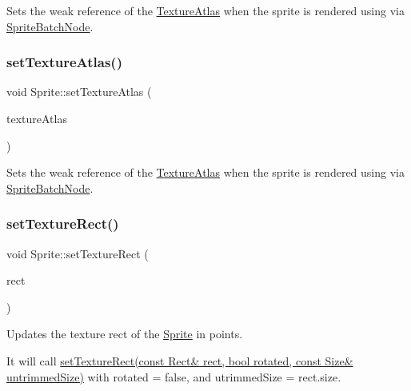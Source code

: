 Sets the weak reference of the \hyperlink{classTextureAtlas}{Texture\+Atlas} when the sprite is rendered using via \hyperlink{classSpriteBatchNode}{Sprite\+Batch\+Node}. \mbox{\label{classSprite_a66f74cd6fa807964c5a9d06d6c927e38}} 
\subsubsection{\texorpdfstring{set\+Texture\+Atlas()}{setTextureAtlas()}\hspace{0.1cm}{\footnotesize\ttfamily [2/2]}}
{\footnotesize\ttfamily void Sprite\+::set\+Texture\+Atlas (\begin{DoxyParamCaption}\item[{\hyperlink{classTextureAtlas}{Texture\+Atlas} $\ast$}]{texture\+Atlas }\end{DoxyParamCaption})\hspace{0.3cm}{\ttfamily [inline]}}

Sets the weak reference of the \hyperlink{classTextureAtlas}{Texture\+Atlas} when the sprite is rendered using via \hyperlink{classSpriteBatchNode}{Sprite\+Batch\+Node}. \mbox{\label{classSprite_a3d342558db357e2bec2eb3368b41bd1f}} 
\subsubsection{\texorpdfstring{set\+Texture\+Rect()}{setTextureRect()}\hspace{0.1cm}{\footnotesize\ttfamily [1/4]}}
{\footnotesize\ttfamily void Sprite\+::set\+Texture\+Rect (\begin{DoxyParamCaption}\item[{const \hyperlink{classRect}{Rect} \&}]{rect }\end{DoxyParamCaption})\hspace{0.3cm}{\ttfamily [virtual]}}

Updates the texture rect of the \hyperlink{classSprite}{Sprite} in points.

It will call \hyperlink{classSprite_ad5cf5f7e651362d5ea7a9635876e464a}{set\+Texture\+Rect(const Rect\& rect, bool rotated, const Size\& untrimmed\+Size)} with {\ttfamily rotated} = false, and {\ttfamily utrimmed\+Size} = rect.\+size. \mbox{\label{classSprite_ad5cf5f7e651362d5ea7a9635876e464a}} 
